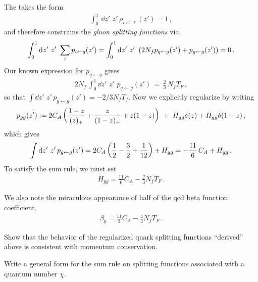 \begin{example}
    The  takes the form
    \begin{align}
        \int_0^1\,\dd z'\,\, z'\,\rho_{i\leftarrow\ell}(z') = 1
        \,,
    \end{align}
    and therefore constrains the \textit{gluon splitting functions} via
\begin{align}
    \int_0^1 \dd z'
    \,\,
    z'
    \,\,
    \sum_i
    p_{i \leftarrow g}(z')
    =
    \int_0^1 \dd z'
    \,\,
    z'
    \,\,
    \left(
        2 N_f p_{q \leftarrow g}(z')
        +
        p_{g\leftarrow g}(z')
    \right)
    = 0
    \,.
\end{align}
%
Our known expression for \(p_{q\leftarrow g}\) gives
\begin{align}
    2 N_f \,\int_0^1 \dd z'\,\, z'\,\, p_{q \leftarrow g}(z')
    \,
    =
    \,
    \frac{2}{3}\,N_f T_F
    \,,
\end{align}
so that \(\int \dd z'\,\, z'\,p_{g\leftarrow g}(z') = -2/3 N_f T_f \).
%
Now we explicitly regularize by writing
\begin{align}
    p_{gg}(z')
    :=
    2 C_A \left(
        \frac{1-z}{(z)_+} + \frac{z}{(1-z)_+} + z(1-z)
    \right)
    \,\,
    +
    \,\,
    H_{gg}\delta(z) + H_{gg} \delta(1-z)
    \,,
\end{align}
which gives
\begin{align}
    \int \dd z'\,\, z'\,p_{g\leftarrow g}(z')
    =
    2 C_A \left(\frac{1}{2} - \frac{3}{2} + \frac{1}{12}\right)
    +
    H_{gg}
    =
    -\frac{11}{6}\,C_A + H_{gg}
    \,.
\end{align}
To satisfy the sum rule, we must set
\begin{align}
    H_{gg} = \frac{11}{6} C_A - \frac{2}{3} N_f T_F
    \,.
\end{align}

We also note the miraculous appearance of half of the \gls{qcd} beta function coefficient,
\begin{align}
    \beta_0
    =
    \frac{11}{3} C_A - \frac{4}{3}N_f T_F
    \,.
\end{align}
\end{example}

\begin{exercise}
    Show that the behavior of the regularized quark splitting functions ``derived'' above is consistent with momentum conservation.
\end{exercise}

\begin{exercise}
    Write a general form for the sum rule on splitting functions associated with a quantum number \(\chi\).
\end{exercise}



